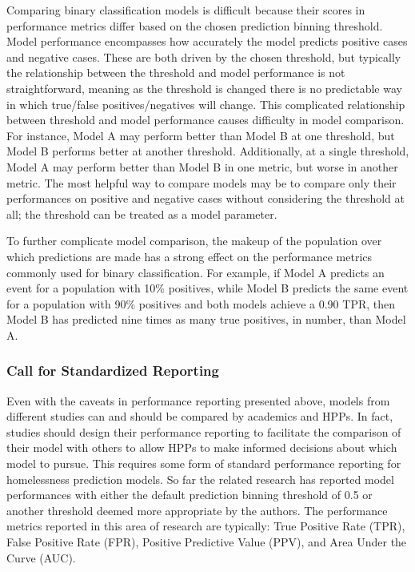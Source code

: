 \documentclass[10pt,letterpaper]{article}
\newcommand{\red}[1]{{\color{red}{#1}}}
\begin{document}
Comparing binary classification models is difficult because their scores in performance metrics differ based on the chosen prediction binning threshold. Model performance encompasses how accurately the model predicts positive cases and negative cases. These are both driven by the chosen threshold, but typically the relationship between the threshold and model performance is not straightforward, meaning as the threshold is changed there is no predictable way in which true/false positives/negatives will change. This complicated relationship between threshold and model performance causes difficulty in model comparison. For instance, Model A may perform better than Model B at one threshold, but Model B performs better at another threshold. Additionally, at a single threshold, Model A may perform better than Model B in one metric, but worse in another metric. The most helpful way to compare models may be to compare only their performances on positive and negative cases without considering the threshold at all; the threshold can be treated as a model parameter.

To further complicate model comparison, the makeup of the population over which predictions are made has a strong effect on the performance metrics commonly used for binary classification. For example, if Model A predicts an event for a population with 10\% positives, while Model B predicts the same event for a population with 90\% positives and both models achieve a 0.90 TPR, then Model B has predicted nine times as many true positives, in number, than Model A. \red{REMOVE THIS PARAGRAPH?}

\subsubsection*{Call for Standardized Reporting}
Even with the caveats in performance reporting presented above, models from different studies can and should be compared by academics and HPPs. In fact, studies should design their performance reporting to facilitate the comparison of their model with others to allow HPPs to make informed decisions about which model to pursue. This requires some form of standard performance reporting for homelessness prediction models. So far the related research has reported model performances with either the default prediction binning threshold of 0.5 or another threshold deemed more appropriate by the authors. The performance metrics reported in this area of research are typically: True Positive Rate (TPR), False Positive Rate (FPR), Positive Predictive Value (PPV), and Area Under the Curve (AUC). 
\end{document}
